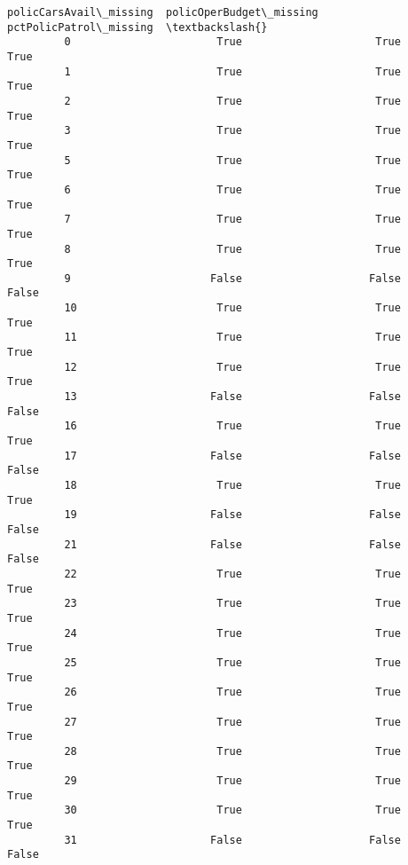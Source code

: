 \documentclass[11pt]{llncs}
\begin{document}
\begin{Verbatim}[commandchars=\\\{\}]
               policCarsAvail\_missing  policOperBudget\_missing  pctPolicPatrol\_missing  \textbackslash{}
         0                       True                     True                    True   
         1                       True                     True                    True   
         2                       True                     True                    True   
         3                       True                     True                    True   
         5                       True                     True                    True   
         6                       True                     True                    True   
         7                       True                     True                    True   
         8                       True                     True                    True   
         9                      False                    False                   False   
         10                      True                     True                    True   
         11                      True                     True                    True   
         12                      True                     True                    True   
         13                     False                    False                   False   
         16                      True                     True                    True   
         17                     False                    False                   False   
         18                      True                     True                    True   
         19                     False                    False                   False   
         21                     False                    False                   False   
         22                      True                     True                    True   
         23                      True                     True                    True   
         24                      True                     True                    True   
         25                      True                     True                    True   
         26                      True                     True                    True   
         27                      True                     True                    True   
         28                      True                     True                    True   
         29                      True                     True                    True   
         30                      True                     True                    True   
         31                     False                    False                   False   

\end{Verbatim}
\end{document}
